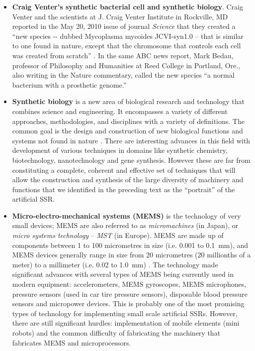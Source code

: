 \begin{itemize}
\item \textbf{Craig Venter’s synthetic bacterial cell and synthetic
biology}. Craig Venter and the scientists at
\textcolor[rgb]{0.2,0.2,0.2}{J. Craig Venter Institute in Rockville, MD
reported in the May 20, 2010 issue of journal
}\textit{\textcolor[rgb]{0.2,0.2,0.2}{Science}}\textcolor[rgb]{0.2,0.2,0.2}{
that they created a “new species -{}- dubbed Mycoplasma mycoides
JCVI-syn1.0 – that is similar to one found in nature, except that the
chromosome that controls each cell was created from scratch”
}\textcolor[rgb]{0.2,0.2,0.2}{. In the same ABC news report,
}\textcolor[rgb]{0.2,0.2,0.2}{Mark Bedau, professor of Philosophy and
Humanities at Reed College in Portland, Ore., also writing in the
Nature commentary, called the new species ``a normal
bacterium with a prosthetic genome.'' }
\end{itemize}

\bigskip

\begin{itemize}
\item \textbf{\textcolor[rgb]{0.2,0.2,0.2}{Synthetic
biology}}\textcolor[rgb]{0.2,0.2,0.2}{ }is a new area of biological
research and technology that combines science and engineering. It
encompasses a variety of different approaches, methodologies, and
disciplines with a variety of definitions. The common goal is the
design and construction of new biological functions and systems not
found in nature . There are interesting advances in this field with
development of various techniques in domains like synthetic chemistry,
biotechnology, nanotechnology and gene synthesis. However these are far
from constituting a complete, coherent and effective set of techniques
that will allow the construction and synthesis of the large diversity
of machinery and functions that we identified in the preceding text as
the “portrait” of the artificial SSR.
\end{itemize}

\bigskip

\begin{itemize}
\item \textbf{Micro-electro-mechanical systems (MEMS)} is the technology
of very small devices; MEMS are also referred to as
\textit{micromachines} (in Japan), or \textit{micro systems technology}
– \textit{MST} (in Europe). MEMS are made up of components between 1 to
100 micrometres in size (i.e. 0.001 to 0.1~mm), and MEMS devices
generally range in size from 20 micrometres (20 millionths of a meter)
to a millimeter (i.e. 0.02 to 1.0~mm) . The technology made significant
advances with several types of MEMS being currently used in modern
equipment:  accelerometers, MEMS gyroscopes, MEMS microphones, pressure
sensors (used in car tire pressure sensors), disposable blood pressure
sensors and micropower devices. This is probably one of the most
promising types of technology for implementing small scale artificial
SSRs. However, there are still significant hurdles: implementation of
mobile elements (mini robots) and the common difficulty of fabricating
the machinery that fabricates MEMS and microprocessors.
\end{itemize}

